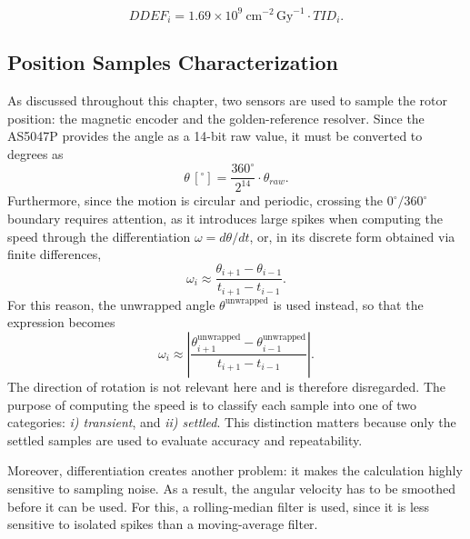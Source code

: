 \begin{equation*}
    DDEF_i = 1.69\times10^{9}~\text{cm}^{-2}\,\text{Gy}^{-1} \cdot TID_i.
\end{equation*}

\subsection{Position Samples Characterization}
\label{subsection:position-samples-characterization}
As discussed throughout this chapter, two sensors are used to sample the rotor position: the magnetic encoder and the golden-reference resolver. Since the AS5047P provides the angle as a 14-bit raw value, it must be converted to degrees as
\begin{equation*}
    \theta\,[^\circ] = \frac{360^\circ}{2^{14}} \cdot \theta_{raw}.
\end{equation*}
Furthermore, since the motion is circular and periodic, crossing the $0^\circ/360^\circ$ boundary requires attention, as it introduces large spikes when computing the speed through the differentiation $\omega = d\theta/dt$, or, in its discrete form obtained via finite differences,
\begin{equation*}
    \omega_i \approx \frac{\theta_{i+1} - \theta_{i-1}}{t_{i+1} - t_{i-1}}.
\end{equation*}
For this reason, the unwrapped angle $\theta^{\text{unwrapped}}$ is used instead, so that the expression becomes
\begin{equation*}
    \omega_i \approx \left|\frac{\theta^{\text{unwrapped}}_{i+1} - \theta^{\text{unwrapped}}_{i-1}}{t_{i+1} - t_{i-1}}\right|.
\end{equation*}
The direction of rotation is not relevant here and is therefore disregarded. The purpose of computing the speed is to classify each sample into one of two categories: \textit{i) transient}, and \textit{ii) settled}. This distinction matters because only the settled samples are used to evaluate accuracy and repeatability.

Moreover, differentiation creates another problem: it makes the calculation highly sensitive to sampling noise. As a result, the angular velocity has to be smoothed before it can be used. For this, a rolling-median filter is used, since it is less sensitive to isolated spikes than a moving-average filter.

